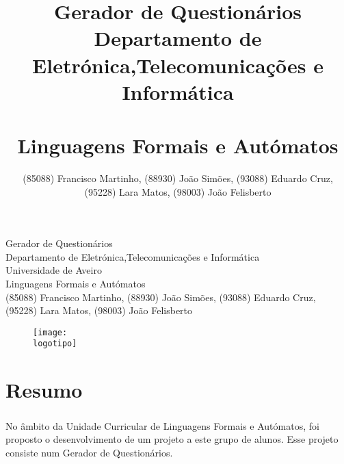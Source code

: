 \documentclass{report}
\begin{document}
%
\def\titulo{Gerador de Questionários}
\def\autores{(85088) Francisco Martinho, (88930) João Simões, (93088) Eduardo Cruz, (95228) Lara Matos, (98003) João Felisberto}
\def\departamento{Departamento de Eletrónica,Telecomunicações e Informática}
\def\uni{Universidade de Aveiro}
\def\uc{Linguagens Formais e Autómatos}
\def\logotipo{ua.pdf}

%
%
\begin{titlepage}

\begin{center}
%
\vspace*{50mm}
%
{\Huge \titulo}\\ 
%
\vspace{10mm}
%
{\Large \departamento}\\
%
\vspace{10mm}
%
%
{\Large \uni}\\
%
\vspace{10mm}
%
{\Large \uc}\\
%
\vspace{10mm}
%
{\LARGE \autores}\\ 
%
\vspace{30mm}
%
\begin{figure}[h]
\center
\texttt{[image: \\logotipo]}
\end{figure}
%
\vspace{30mm}
\end{center}
%
\end{titlepage}

\title{%
{\Huge\textbf{\titulo}}\\
{\Large \departamento\\ \empresa\\ \uc}
}
%
\author{%
    \autores \\
    \autorescontactos
}
%
\date{\data}
%


\tableofcontents

\clearpage
{}

\chapter{Resumo}
\label{chap.resumo}

\paragraph{ }
No âmbito da Unidade Curricular de Linguagens Formais e Autómatos, foi proposto o desenvolvimento de um projeto a este grupo de alunos. Esse projeto consiste num Gerador de Questionários.
\end{document}
